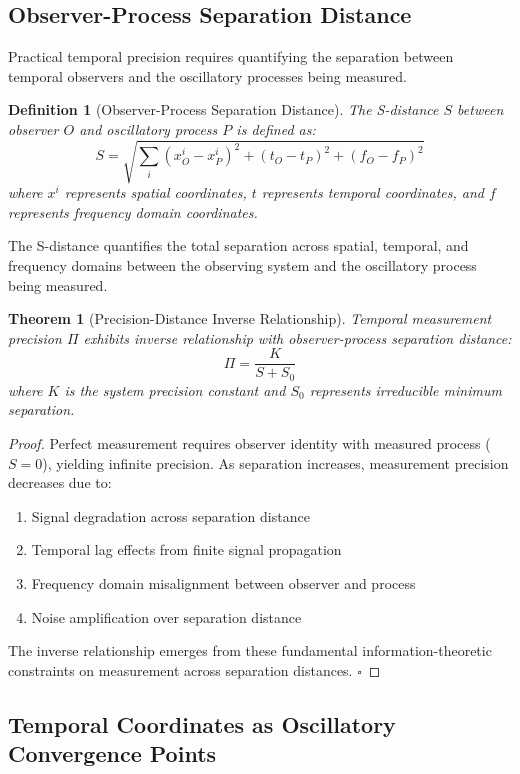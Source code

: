 \documentclass[12pt,a4paper]{article}
\newtheorem{theorem}{Theorem}
\newtheorem{definition}{Definition}
\begin{document}
\subsection{Observer-Process Separation Distance}

Practical temporal precision requires quantifying the separation between temporal observers and the oscillatory processes being measured.

\begin{definition}[Observer-Process Separation Distance]
The S-distance $S$ between observer $O$ and oscillatory process $P$ is defined as:
$$S = \sqrt{\sum_{i} (x_O^i - x_P^i)^2 + (t_O - t_P)^2 + (f_O - f_P)^2}$$
where $x^i$ represents spatial coordinates, $t$ represents temporal coordinates, and $f$ represents frequency domain coordinates.
\end{definition}

The S-distance quantifies the total separation across spatial, temporal, and frequency domains between the observing system and the oscillatory process being measured.

\begin{theorem}[Precision-Distance Inverse Relationship]
Temporal measurement precision $\Pi$ exhibits inverse relationship with observer-process separation distance:
$$\Pi = \frac{K}{S + S_0}$$
where $K$ is the system precision constant and $S_0$ represents irreducible minimum separation.
\end{theorem}

\begin{proof}
Perfect measurement requires observer identity with measured process ($S = 0$), yielding infinite precision. As separation increases, measurement precision decreases due to:
\begin{enumerate}
\item Signal degradation across separation distance
\item Temporal lag effects from finite signal propagation
\item Frequency domain misalignment between observer and process
\item Noise amplification over separation distance
\end{enumerate}

The inverse relationship emerges from these fundamental information-theoretic constraints on measurement across separation distances. $\square$
\end{proof}

\subsection{Temporal Coordinates as Oscillatory Convergence Points}
\end{document}
